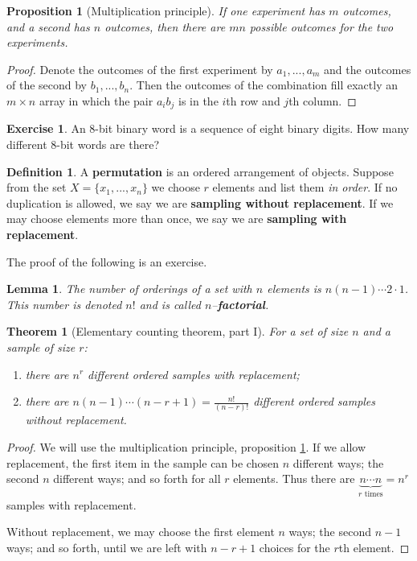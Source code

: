 \documentclass[a4paper,leqno]{article}
\numberwithin{equation}{section}
\newtheorem{thm}[equation]{Theorem}
\newtheorem{lem}[equation]{Lemma}
\newtheorem{prp}[equation]{Proposition}
\theoremstyle{definition}
\newtheorem{defn}[equation]{Definition}
\newtheorem{exercise}[equation]{Exercise}
\theoremstyle{remark}
\newcommand{\df}{\textbf}
\begin{document}
\begin{prp}[Multiplication principle]\label{prp:mult}
  If one experiment has $ m $ outcomes, and a second has $ n $ outcomes, then there are $ mn $ possible outcomes for the two experiments.
\end{prp}
\begin{proof}
  Denote the outcomes of the first experiment by $ a_1,...,a_m $ and the outcomes of the second by $ b_1,...,b_n $. Then the outcomes
  of the combination fill exactly an $ m \times n $ array in which the pair $ a_i b_j $ is in the $ i$th row and $ j$th column.
\end{proof}

\begin{exercise}
  An 8-bit binary word is a sequence of eight binary digits. How many different 8-bit words are there?
\end{exercise}

\begin{defn}
  A \df{permutation} is an ordered arrangement of objects. Suppose from the set $ X = \{x_1,...,x_n\} $ we choose $ r $ elements
  and list them \emph{in order}. If no duplication is allowed, we say we are \df{sampling without replacement}. If we may choose elements
  more than once, we say we are \df{sampling with replacement}.
\end{defn}

The proof of the following is an exercise.

\begin{lem}
  The number of orderings of a set with $ n $ elements is $ n(n-1)\cdots2\cdot1 $. This number is denoted $ n! $ and
  is called $ n $--\df{factorial}.
\end{lem}

\begin{thm}[Elementary counting theorem, part I]
  For a set of size $ n $ and a sample of size $ r $:
  \begin{enumerate}
    \item there are $ n^r $ different ordered samples with replacement;
    \item there are $ n(n-1)\cdots(n - r + 1) = \frac{n!}{(n - r)!} $ different ordered samples without replacement.
  \end{enumerate}
\end{thm}
\begin{proof}
  We will use the multiplication principle, proposition \ref{prp:mult}. If we allow replacement, the first item in the sample can be chosen $ n $
  different ways; the second $ n $ different ways; and so forth for all $ r $ elements. Thus there are $ \underbrace{n \cdots n}_{r\text{ times}} = n^r $
  samples with replacement.

  Without replacement, we may choose the first element $ n $ ways; the second $ n - 1 $ ways; and so forth, until we are left with $ n - r + 1 $ choices
  for the $ r$th element.
\end{proof}
\end{document}
